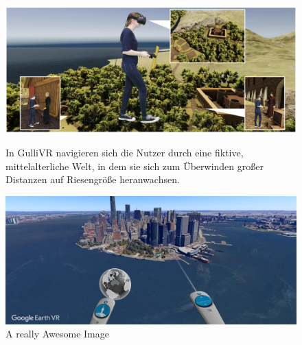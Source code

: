 \begin{figure}[!htb]
  \includegraphics[width=\linewidth]{images/gulli_vr.png}
  \caption{In GulliVR \cite{Krekhov2018GulliVRb} navigieren sich die Nutzer durch eine fiktive, mittelalterliche Welt, in dem sie sich zum Überwinden großer Distanzen auf Riesengröße heranwachsen.}\label{fig:awesome_image1}
\endminipage\hfill
{}
  \includegraphics[width=\linewidth]{images/google_navigation.jpg}
  \caption{A really Awesome Image}\label{fig:awesome_image2}
\endminipage
\end{figure}

